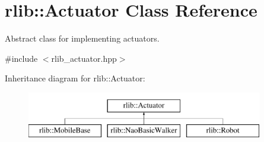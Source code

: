 \hypertarget{classrlib_1_1Actuator}{\section{rlib\-:\-:Actuator Class Reference}
\label{classrlib_1_1Actuator}
}


Abstract class for implementing actuators.  




{\ttfamily \#include $<$rlib\-\_\-actuator.\-hpp$>$}

Inheritance diagram for rlib\-:\-:Actuator\-:\begin{figure}[H]
\begin{center}
\leavevmode
\includegraphics[height=2.000000cm]{classrlib_1_1Actuator}
\end{center}
\end{figure}
